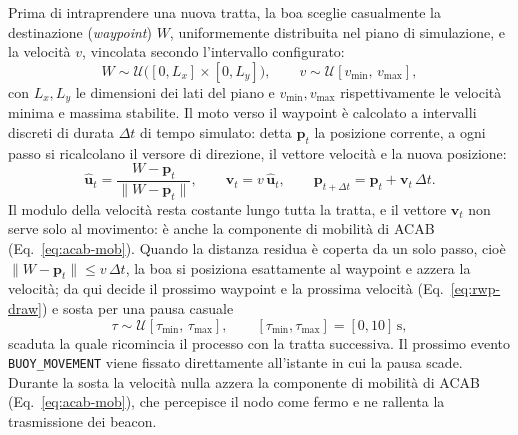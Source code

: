 Prima di intraprendere una nuova tratta, la boa sceglie casualmente la destinazione (\emph{waypoint}) $W$,
uniformemente distribuita nel piano di simulazione, e la velocit\`a $v$, vincolata secondo l'intervallo configurato:
\begin{equation}
  W \sim \mathcal{U}\big([0, L_x] \times [0, L_y]\big),
  \qquad
  v \sim \mathcal{U}[v_{\min},\, v_{\max}],
  \label{eq:rwp-draw}
\end{equation}
con $L_x,L_y$ le dimensioni dei lati del piano e $v_{\min},v_{\max}$ rispettivamente le velocit\`a minima e massima stabilite. 
Il moto verso il waypoint \`e calcolato a intervalli discreti di
durata $\Delta t$ di tempo simulato: detta $\mathbf{p}_t$ la
posizione corrente, a ogni passo si ricalcolano il versore di direzione, il vettore
velocit\`a e la nuova posizione:
\begin{equation}
  \hat{\mathbf{u}}_t = \frac{W - \mathbf{p}_t}{\lVert W - \mathbf{p}_t \rVert},
  \qquad
  \mathbf{v}_t = v\,\hat{\mathbf{u}}_t,
  \qquad
  \mathbf{p}_{t+\Delta t} = \mathbf{p}_t + \mathbf{v}_t\,\Delta t .
  \label{eq:rwp-step}
\end{equation}
Il modulo della velocit\`a resta costante lungo tutta la tratta, e il vettore
$\mathbf{v}_t$ non serve solo al movimento: \`e anche la componente di
mobilit\`a di ACAB (Eq.~\ref{eq:acab-mob}). Quando la distanza residua \`e coperta da un
solo passo, cio\`e $\lVert W - \mathbf{p}_t \rVert \le v\,\Delta t$, la boa si posiziona
esattamente al waypoint e azzera la velocit\`a; da qui decide il prossimo waypoint e
la prossima velocit\`a (Eq.~\ref{eq:rwp-draw}) e sosta per una pausa casuale
\begin{equation}
  \tau \sim \mathcal{U}[\tau_{\min},\, \tau_{\max}],
  \qquad
  [\tau_{\min}, \tau_{\max}] = [0, 10]\,\si{\second},
  \label{eq:rwp-pause}
\end{equation}
scaduta la quale ricomincia il processo con la tratta successiva.
Il prossimo evento \texttt{BUOY\_MOVEMENT} viene fissato direttamente all'istante in cui la pausa
scade. Durante la sosta la velocit\`a nulla azzera la componente di mobilit\`a di
ACAB (Eq.~\ref{eq:acab-mob}), che percepisce il nodo come fermo e ne rallenta la trasmissione dei beacon.


